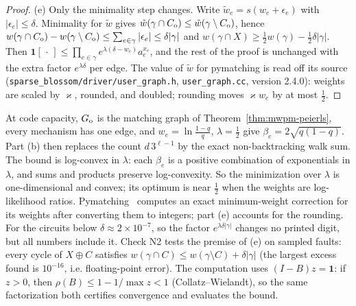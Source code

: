 \begin{proof}
(e) Only the minimality step changes. Write $\tilde w_e=s(w_e+\epsilon_e)$ with $|\epsilon_e|\le\delta$. Minimality for $\tilde w$ gives $\tilde w(\gamma\cap C_{\rm o})\le\tilde w(\gamma\setminus C_{\rm o})$, hence $w(\gamma\cap C_{\rm o})-w(\gamma\setminus C_{\rm o})\le\sum_{e\in\gamma}|\epsilon_e|\le\delta|\gamma|$ and $w(\gamma\cap X)\ge\tfrac12w(\gamma)-\tfrac12\delta|\gamma|$. Then $\mathbf 1[\,\cdot\,]\le\prod_{e\in\gamma}e^{\lambda(\delta-w_e)}a_e^{x_e}$, and the rest of the proof is unchanged with the extra factor $e^{\lambda\delta}$ per edge. The value of $\tilde w$ for pymatching is read off its source (\texttt{sparse\_blossom/driver/user\_graph.h}, \texttt{user\_graph.cc}, version 2.4.0): weights are scaled by $\varkappa$, rounded, and doubled; rounding moves $\varkappa w_e$ by at most $\tfrac12$.
\end{proof}

\noindent At code capacity, $G_{\rm o}$ is the matching graph of Theorem~\ref{thm:mwpm-peierls}, every mechanism has one edge, and $w_e=\ln\frac{1-q}q$, $\lambda=\tfrac12$ give $\beta_e=2\sqrt{q(1-q)}$. Part (b) then replaces the count $d\,3^{\ell-1}$ by the exact non-backtracking walk sum.
The bound is log-convex in $\lambda$: each $\beta_e$ is a positive combination of exponentials in $\lambda$, and sums and products preserve log-convexity. So the minimization over $\lambda$ is one-dimensional and convex; its optimum is near $\tfrac12$ when the weights are log-likelihood ratios.
Pymatching~\cite{SB} computes an exact minimum-weight correction for its weights after converting them to integers; part (e) accounts for the rounding. For the circuits below $\delta\approx2\times10^{-7}$, so the factor $e^{\lambda\delta|\gamma|}$ changes no printed digit, but all numbers include it. Check N2 tests the premise of (e) on sampled faults: every cycle of $X\oplus C$ satisfies $w(\gamma\cap C)\le w(\gamma\setminus C)+\delta|\gamma|$ (the largest excess found is $10^{-16}$, i.e. floating-point error).
The computation uses $(I-B)z=\mathbf 1$: if $z>0$, then $\rho(B)\le1-1/\max z<1$ (Collatz--Wielandt), so the same factorization both certifies convergence and evaluates the bound.

